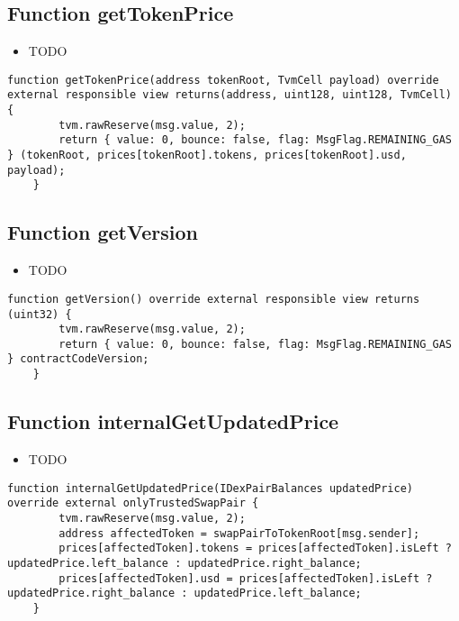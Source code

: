 \subsection{Function getTokenPrice}

\noindent\begin{itemize}
\item TODO
\end{itemize}

\begin{lstlisting}[firstnumber=159]
    function getTokenPrice(address tokenRoot, TvmCell payload) override external responsible view returns(address, uint128, uint128, TvmCell) {
        tvm.rawReserve(msg.value, 2);
        return { value: 0, bounce: false, flag: MsgFlag.REMAINING_GAS } (tokenRoot, prices[tokenRoot].tokens, prices[tokenRoot].usd, payload);
    }
\end{lstlisting}

\subsection{Function getVersion}

\noindent\begin{itemize}
\item TODO
\end{itemize}

\begin{lstlisting}[firstnumber=99]
    function getVersion() override external responsible view returns (uint32) { 
        tvm.rawReserve(msg.value, 2);
        return { value: 0, bounce: false, flag: MsgFlag.REMAINING_GAS } contractCodeVersion;
    }
\end{lstlisting}

\subsection{Function internalGetUpdatedPrice}

\noindent\begin{itemize}
\item TODO
\end{itemize}

\begin{lstlisting}[firstnumber=146]
    function internalGetUpdatedPrice(IDexPairBalances updatedPrice) override external onlyTrustedSwapPair {
        tvm.rawReserve(msg.value, 2);
        address affectedToken = swapPairToTokenRoot[msg.sender];
        prices[affectedToken].tokens = prices[affectedToken].isLeft ? updatedPrice.left_balance : updatedPrice.right_balance;
        prices[affectedToken].usd = prices[affectedToken].isLeft ? updatedPrice.right_balance : updatedPrice.left_balance;
    }
\end{lstlisting}


